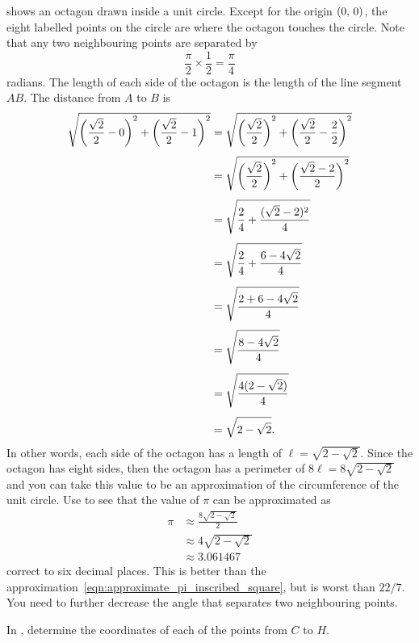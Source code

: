\documentclass[a4paper,oneside,12pt]{article}
\begin{document}
 shows an octagon drawn inside a
unit circle.  Except for the origin $\tuple{0}{0}$, the eight labelled
points on the circle are where the octagon touches the circle.  Note
that any two neighbouring points are separated by
\[
\frac{\pi}{2} \times \frac{1}{2}
=
\frac{\pi}{4}
\]
radians.  The length of each side of the octagon is the length of the
line segment $AB$.  The distance from $A$ to $B$ is
\begin{align*}
\sqrt{
  \parenthesis*{\frac{\sqrt{2}}{2} - 0}^2
  +
  \parenthesis*{\frac{\sqrt{2}}{2} - 1}^2
}
&=
\sqrt{
  \parenthesis*{\frac{\sqrt{2}}{2}}^2
  +
  \parenthesis*{\frac{\sqrt{2}}{2} - \frac{2}{2}}^2
} \\[4pt]
&=
\sqrt{
  \parenthesis*{\frac{\sqrt{2}}{2}}^2
  +
  \parenthesis*{\frac{\sqrt{2} - 2}{2}}^2
} \\[4pt]
&=
\sqrt{
  \frac{2}{4}
  +
  \frac{(\sqrt{2} - 2)^2}{4}
} \\[4pt]
&=
\sqrt{
  \frac{2}{4}
  +
  \frac{6 - 4\sqrt{2}}{4}
} \\[4pt]
&=
\sqrt{
  \frac{
    2 + 6 - 4\sqrt{2}
  }{
    4
  }
} \\[4pt]
&=
\sqrt{
  \frac{
    8 - 4\sqrt{2}
  }{
    4
  }
} \\[4pt]
&=
\sqrt{
  \frac{
    4(2 - \sqrt{2})
  }{
    4
  }
} \\[4pt]
&=
\sqrt{
  2 - \sqrt{2}
}.
\end{align*}
In other words, each side of the octagon has a length of
$\ell = \sqrt{2 - \sqrt{2}}$.  Since the octagon has eight sides, then
the octagon has a perimeter of $8\ell = 8\sqrt{2 - \sqrt{2}}$ and you
can take this value to be an approximation of the circumference of the
unit circle.  Use  to see
that the value of $\pi$ can be approximated as
\begin{align*}
\pi
&\approx
\frac{
  8\sqrt{2 - \sqrt{2}}
}{
  2
} \\[4pt]
&\approx
4\sqrt{2 - \sqrt{2}} \\[4pt]
&\approx
3.061467
\end{align*}
correct to six decimal places.  This is better than the
approximation~\eqref{eqn:approximate_pi_inscribed_square}, but is
worst than $22 / 7$.  You need to further decrease the angle that
separates two neighbouring points.

\begin{exercise}
In , determine the coordinates of
each of the points from $C$ to $H$.
\end{exercise}
\end{document}
